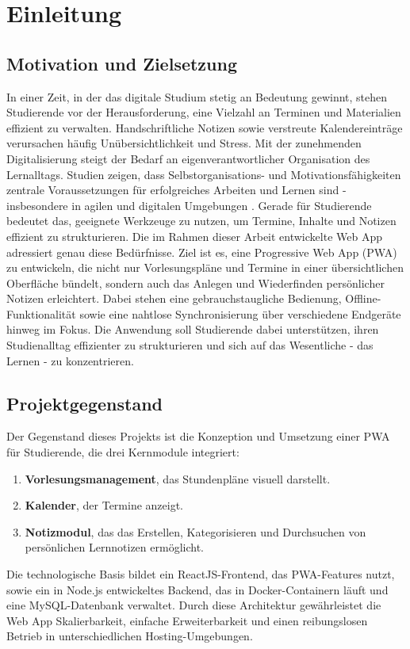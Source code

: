 \chapter{Einleitung}
\section{Motivation und Zielsetzung}
In einer Zeit, in der das digitale Studium stetig an Bedeutung gewinnt, stehen Studierende vor der Herausforderung, eine Vielzahl an Terminen und Materialien effizient zu verwalten. Handschriftliche Notizen sowie verstreute Kalendereinträge verursachen häufig Unübersichtlichkeit und Stress.\newline 
Mit der zunehmenden Digitalisierung steigt der Bedarf an eigenverantwortlicher Organisation des Lernalltags. Studien zeigen, dass Selbstorganisations- und Motivationsfähigkeiten zentrale Voraussetzungen für erfolgreiches Arbeiten und Lernen sind - insbesondere in agilen und digitalen Umgebungen \autocite{selbstorganisation}. Gerade für Studierende bedeutet das, geeignete Werkzeuge zu nutzen, um Termine, Inhalte und Notizen effizient zu strukturieren. Die im Rahmen dieser Arbeit entwickelte Web App adressiert genau diese Bedürfnisse. \newline \newline
Ziel ist es, eine Progressive Web App (PWA) zu entwickeln, die nicht nur Vorlesungspläne und Termine in einer übersichtlichen Oberfläche bündelt, sondern auch das Anlegen und Wiederfinden persönlicher Notizen erleichtert. Dabei stehen eine gebrauchstaugliche Bedienung, Offline-Funktionalität sowie eine nahtlose Synchronisierung über verschiedene Endgeräte hinweg im Fokus. Die Anwendung soll Studierende dabei unterstützen, ihren Studienalltag effizienter zu strukturieren und sich auf das Wesentliche - das Lernen - zu konzentrieren.

\section{Projektgegenstand}
Der Gegenstand dieses Projekts ist die Konzeption und Umsetzung einer PWA für Studierende, die drei Kernmodule integriert:
\begin{enumerate}
  \item \textbf{Vorlesungsmanagement}, das Stundenpläne visuell darstellt.
  \item \textbf{Kalender}, der Termine anzeigt.
  \item \textbf{Notizmodul}, das das Erstellen, Kategorisieren und Durchsuchen von persönlichen Lernnotizen ermöglicht.
\end{enumerate}
Die technologische Basis bildet ein ReactJS-Frontend, das PWA-Features nutzt, sowie ein in Node.js entwickeltes Backend, das in Docker-Containern läuft und eine MySQL-Datenbank verwaltet. Durch diese Architektur gewährleistet die Web App Skalierbarkeit, einfache Erweiterbarkeit und einen reibungslosen Betrieb in unterschiedlichen Hosting-Umgebungen.